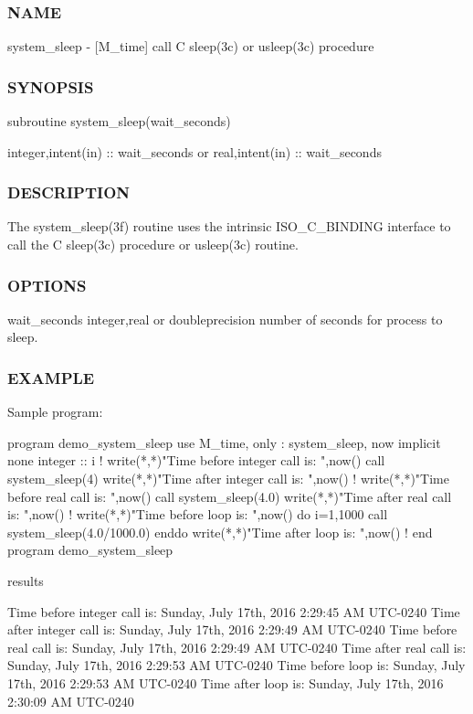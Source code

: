 \begin{DoxyVerb}
\subsubsection*{N\+A\+ME}

system\+\_\+sleep -\/ \mbox{[}M\+\_\+time\mbox{]} call C sleep(3c) or usleep(3c) procedure \subsubsection*{S\+Y\+N\+O\+P\+S\+IS}

subroutine system\+\_\+sleep(wait\+\_\+seconds)

integer,intent(in) \+:\+: wait\+\_\+seconds or real,intent(in) \+:\+: wait\+\_\+seconds

\subsubsection*{D\+E\+S\+C\+R\+I\+P\+T\+I\+ON}

The system\+\_\+sleep(3f) routine uses the intrinsic I\+S\+O\+\_\+\+C\+\_\+\+B\+I\+N\+D\+I\+NG interface to call the C sleep(3c) procedure or usleep(3c) routine.

\subsubsection*{O\+P\+T\+I\+O\+NS}

wait\+\_\+seconds integer,real or doubleprecision number of seconds for process to sleep.

\subsubsection*{E\+X\+A\+M\+P\+LE}

\begin{DoxyVerb}Sample program:

 program demo_system_sleep
 use M_time, only : system_sleep, now
 implicit none
 integer :: i
    !
    write(*,*)"Time before integer call is: ",now()
    call system_sleep(4)
    write(*,*)"Time after  integer call is: ",now()
    !
    write(*,*)"Time before real call is: ",now()
    call system_sleep(4.0)
    write(*,*)"Time after  real call is: ",now()
    !
    write(*,*)"Time before loop is: ",now()
    do i=1,1000
       call system_sleep(4.0/1000.0)
    enddo
    write(*,*)"Time after loop  is: ",now()
    !
 end program demo_system_sleep

results

 Time before integer call is: Sunday, July 17th, 2016 2:29:45 AM UTC-0240
 Time after integer call is: Sunday, July 17th, 2016 2:29:49 AM UTC-0240
 Time before real call is: Sunday, July 17th, 2016 2:29:49 AM UTC-0240
 Time after  real call is: Sunday, July 17th, 2016 2:29:53 AM UTC-0240
 Time before loop is: Sunday, July 17th, 2016 2:29:53 AM UTC-0240
 Time after loop  is: Sunday, July 17th, 2016 2:30:09 AM UTC-0240 \end{DoxyVerb}
 


\end{DoxyVerb}
